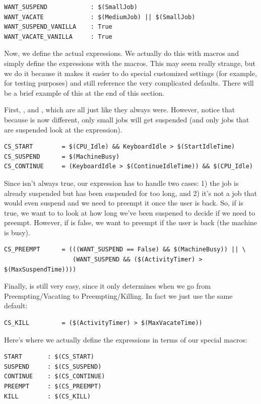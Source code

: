 \begin{verbatim}
WANT_SUSPEND            : $(SmallJob)
WANT_VACATE             : $(MediumJob) || $(SmallJob)
WANT_SUSPEND_VANILLA    : True
WANT_VACATE_VANILLA     : True
\end{verbatim}

Now, we define the actual expressions.  We actually do this with
macros and simply define the expressions with the macros.  This may
seem really strange, but we do it because it makes it easier to do
special customized settings (for example, for testing purposes) and still
reference the very complicated defaults.  There will be a brief
example of this at the end of this section. 

First, ,  and , which are all
just like they always were.  However, notice that because
 is now different, only small jobs will get
suspended (and only jobs that are suspended look at the
 expression).

\begin{verbatim}
CS_START        = $(CPU_Idle) && KeyboardIdle > $(StartIdleTime)
CS_SUSPEND      = $(MachineBusy)
CS_CONTINUE     = (KeyboardIdle > $(ContinueIdleTime)) && $(CPU_Idle)
\end{verbatim}

Since  isn't always true, our 
expression has to handle two cases: 1) the job is already suspended
but has been suspended for too long, and 2) it's not a job that would
even suspend and we need to preempt it once the user is back.
So, if  is true, we want to to look at how long
we've been suspened to decide if we need to preempt.
However, if  is false, we want to preempt if the
user is back (the machine is busy). 
\begin{verbatim}
CS_PREEMPT      = (((WANT_SUSPEND == False) && $(MachineBusy)) || \
                   (WANT_SUSPEND && ($(ActivityTimer) > $(MaxSuspendTime))))
\end{verbatim}

Finally,  is still very easy, since it only determines when
we go from Preempting/Vacating to Preempting/Killing.  
In fact we just use the same default:
\begin{verbatim}
CS_KILL         = ($(ActivityTimer) > $(MaxVacateTime))
\end{verbatim}

Here's where we actually define the expressions in terms of our
special macros:
\begin{verbatim}
START       : $(CS_START)
SUSPEND     : $(CS_SUSPEND)
CONTINUE    : $(CS_CONTINUE)
PREEMPT     : $(CS_PREEMPT)
KILL        : $(CS_KILL)
\end{verbatim}

